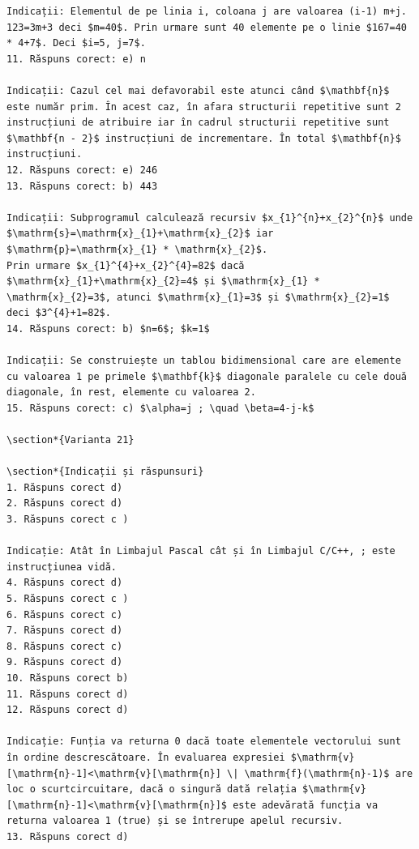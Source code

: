 \documentclass[10pt]{article}
\begin{document}
\begin{verbatim}
Indicații: Elementul de pe linia i, coloana j are valoarea (i-1) m+j. 123=3m+3 deci $m=40$. Prin urmare sunt 40 elemente pe o linie $167=40 * 4+7$. Deci $i=5, j=7$.
11. Răspuns corect: e) n

Indicații: Cazul cel mai defavorabil este atunci când $\mathbf{n}$ este număr prim. În acest caz, în afara structurii repetitive sunt 2 instrucțiuni de atribuire iar în cadrul structurii repetitive sunt $\mathbf{n - 2}$ instrucțiuni de incrementare. În total $\mathbf{n}$ instrucțiuni.
12. Răspuns corect: e) 246
13. Răspuns corect: b) 443

Indicații: Subprogramul calculează recursiv $x_{1}^{n}+x_{2}^{n}$ unde $\mathrm{s}=\mathrm{x}_{1}+\mathrm{x}_{2}$ iar $\mathrm{p}=\mathrm{x}_{1} * \mathrm{x}_{2}$.
Prin urmare $x_{1}^{4}+x_{2}^{4}=82$ dacă $\mathrm{x}_{1}+\mathrm{x}_{2}=4$ și $\mathrm{x}_{1} * \mathrm{x}_{2}=3$, atunci $\mathrm{x}_{1}=3$ și $\mathrm{x}_{2}=1$ deci $3^{4}+1=82$.
14. Răspuns corect: b) $n=6$; $k=1$

Indicații: Se construiește un tablou bidimensional care are elemente cu valoarea 1 pe primele $\mathbf{k}$ diagonale paralele cu cele două diagonale, în rest, elemente cu valoarea 2.
15. Răspuns corect: c) $\alpha=j ; \quad \beta=4-j-k$

\section*{Varianta 21}

\section*{Indicații și răspunsuri}
1. Răspuns corect d)
2. Răspuns corect d)
3. Răspuns corect c )

Indicație: Atât în Limbajul Pascal cât și în Limbajul C/C++, ; este instrucțiunea vidă.
4. Răspuns corect d)
5. Răspuns corect c )
6. Răspuns corect c)
7. Răspuns corect d)
8. Răspuns corect c)
9. Răspuns corect d)
10. Răspuns corect b)
11. Răspuns corect d)
12. Răspuns corect d)

Indicație: Funția va returna 0 dacă toate elementele vectorului sunt în ordine descrescătoare. În evaluarea expresiei $\mathrm{v}[\mathrm{n}-1]<\mathrm{v}[\mathrm{n}] \| \mathrm{f}(\mathrm{n}-1)$ are loc o scurtcircuitare, dacă o singură dată relația $\mathrm{v}[\mathrm{n}-1]<\mathrm{v}[\mathrm{n}]$ este adevărată funcția va returna valoarea 1 (true) și se întrerupe apelul recursiv.
13. Răspuns corect d)


\end{verbatim}
\end{document}
